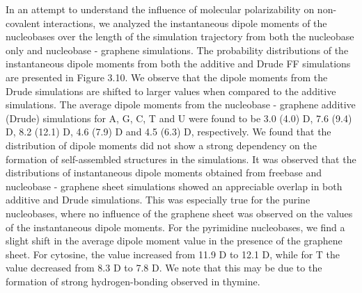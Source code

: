     In an attempt to understand the influence of molecular polarizability on non-covalent interactions, we analyzed the instantaneous dipole moments of the nucleobases over the length of the simulation trajectory from both the nucleobase only and nucleobase - graphene simulations. The probability distributions of the instantaneous dipole moments from both the additive and Drude FF simulations are presented in Figure 3.10. We observe that the dipole moments from the Drude simulations are shifted to larger values when compared to the additive simulations. The average dipole moments from the nucleobase - graphene additive (Drude) simulations for A, G, C, T and U were found to be 3.0 (4.0) D, 7.6 (9.4) D, 8.2 (12.1) D, 4.6 (7.9) D and 4.5 (6.3) D, respectively. We found that the distribution of dipole moments did not show a strong dependency on the formation of self-assembled structures in the simulations. It was observed that the distributions of instantaneous dipole moments obtained from freebase and nucleobase - graphene sheet simulations showed an appreciable overlap in both additive and Drude simulations. This was especially true for the purine nucleobases, where no influence of the graphene sheet was observed on the values of the instantaneous dipole moments. For the pyrimidine nucleobases, we find a slight shift in the average dipole moment value in the presence of the graphene sheet. For cytosine, the value increased from 11.9 D to 12.1 D, while for T the value decreased from 8.3 D to 7.8 D. We note that this may be due to the formation of strong hydrogen-bonding observed in thymine.

